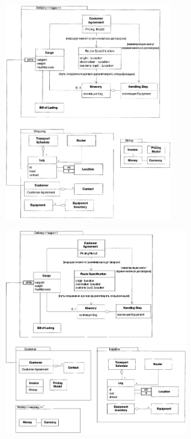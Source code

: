 \documentclass[xetex,mathserif,serif]{beamer}
\begin{document}
	\begin{frame}
		\begin{center}
			\includegraphics[width=0.55\textwidth]{shippingDistilled.png}
		\end{center}
	\end{frame}

	\begin{frame}
		\begin{center}
			\includegraphics[width=0.6\textwidth]{shippingRepacked.png}
		\end{center}
	\end{frame}
\end{document}
